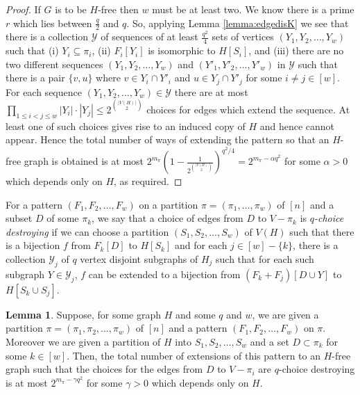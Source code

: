 \documentclass[12pt]{article}
\theoremstyle{definition}
\newtheorem{lemma}[theorem]{Lemma}
\newcommand\cY{{\mathcal Y}}
\begin{document}
\begin{proof}
If $G$ is to be $H$-free then $w$ must be at least two. 
We know there is a prime $r$ which lies between $\frac{q}{2}$ and $q$. 
So, applying Lemma \ref{lemma:edgedisK} we see that there is a collection $\cY$ of sequences of  at least $\frac{q^2}{4}$ sets of vertices $(Y_1,Y_2,\ldots,Y_w)$ such that (i)  $Y_i\subseteq \pi_i$, (ii)  $F_i[Y_i]$ is isomorphic to $H[S_i]$, and (iii) there are no two different sequences $(Y_1,Y_2,\ldots,Y_w)$ and $(Y'_1,Y'_2,\ldots,Y'_w)$ in $\cY$ such that there is a pair $\{v,u\}$ where $v\in Y_i\cap Y'_i$ and $u\in Y_j\cap Y'_j$ for some $i\neq j\in [w]$. For each sequence $(Y_1,Y_2,\ldots,Y_w)\in \cY$ there are at most $\prod_{1\le i<j\le w}|Y_i|\cdot|Y_j|\le 2^{|V(H)| \choose 2}$ choices for edges which extend the sequence. At least one of such choices gives rise to an induced copy of $H$ and hence cannot appear. Hence the total number of ways of  extending the pattern so that an $H$-free graph is obtained  is at most 
$2^{m_\pi}\left(1-\frac{1}{2^{|V(H) \choose 2}}\right)^{q^2/4}= 2^{m_\pi-\alpha  q^2}$ for some $\alpha>0$ which depends only on $H$, as required. 
\end{proof} 

For a  pattern  $(F_1,F_2,\ldots,F_w)$  on a partition $\pi=(\pi_1,\ldots,\pi_w)$ of $[n]$ and a subset $D$ of some $\pi_k$,
we say that a choice of edges from $D$ to $V-\pi_k$ is {\it $q$-choice destroying} if  we can choose a partition $(S_1,S_2,\ldots,S_w)$ of $V(H)$ 
such that there is a bijection $f$ from $F_k[D]$ to $H[S_k]$ and for each $ j\in [w]-\{k\}$, there is a collection $\cY_j$ of $q$ vertex disjoint subgraphs of $H_j$ such that for each such subgraph $Y\in \cY_j$, $f$ can be extended to a bijection from $(F_k+F_j)[D \cup Y]$ to $H[S_k \cup S_j]$.


\begin{lemma}\label{dangerous2cor}
Suppose, for some  graph $H$ and some $q$ and $w$,  we are given a partition $\pi=(\pi_1,\pi_2,\ldots,\pi_w)$ of $[n]$ and a pattern $(F_1,F_2,\ldots,F_w)$ on $\pi$. Moreover we are given a partition of $H$ into $S_1,S_2,\ldots, S_w$ and a set $D\subset \pi_k$ for some $k\in [w]$. 
Then, the  total number of extensions of this pattern to an $H$-free graph  such that the choices for the edges from $D$ 
to $V-\pi_i$ are $q$-choice destroying   is at most $2^{m_\pi-\gamma  q^2}$ for some $\gamma>0$ which depends only on $H$. 
\end{lemma}
\end{document}
